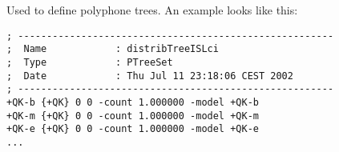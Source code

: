 
\section{}

Used to define polyphone trees. An example looks like this:

\begin{verbatim}
; -------------------------------------------------------
;  Name            : distribTreeISLci
;  Type            : PTreeSet
;  Date            : Thu Jul 11 23:18:06 CEST 2002
; -------------------------------------------------------
+QK-b {+QK} 0 0 -count 1.000000 -model +QK-b
+QK-m {+QK} 0 0 -count 1.000000 -model +QK-m
+QK-e {+QK} 0 0 -count 1.000000 -model +QK-e
...
\end{verbatim}

